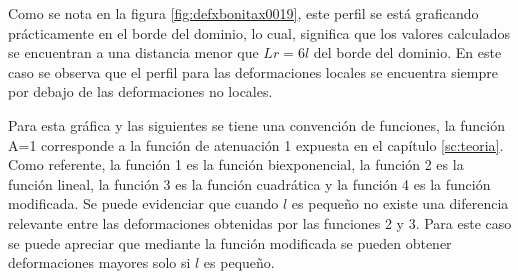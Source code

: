 	Como se nota en la figura \ref{fig:defxbonitax0019}, este perfil se está graficando prácticamente en el borde del dominio, lo cual, significa que los valores calculados se encuentran a una distancia menor que $Lr=6l$ del borde del dominio. En este caso se observa que el perfil para las deformaciones locales se encuentra siempre por debajo de las deformaciones no locales.

	Para esta gráfica y las siguientes se tiene una convención de funciones, la función A=1 corresponde a la función de atenuación 1 expuesta en el capítulo \ref{sc:teoria}. Como referente, la función 1 es la función biexponencial, la función 2 es la función lineal, la función 3 es la función cuadrática y la función 4 es la función modificada. Se puede evidenciar que cuando $l$ es pequeño no existe una diferencia relevante entre las deformaciones obtenidas por las funciones 2 y 3. Para este caso se puede apreciar que mediante la función modificada se pueden obtener deformaciones mayores solo si $l$ es pequeño.


